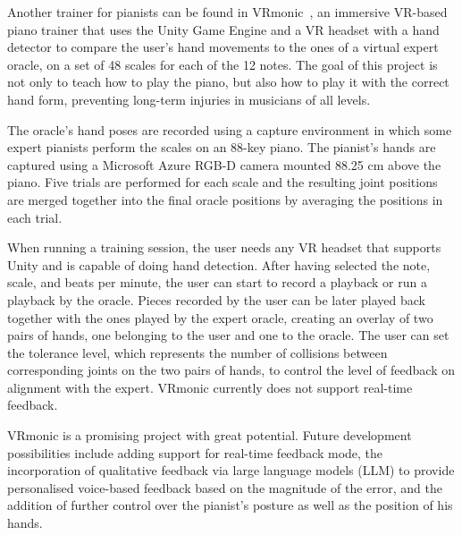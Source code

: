 Another trainer for pianists can be found in VRmonic~\cite{vrmonic-piano-trainer}, an immersive VR-based piano trainer
that uses the Unity Game Engine and a VR headset with a hand detector to compare the user's hand movements to the ones
of a virtual expert oracle, on a set of 48 scales for each of the 12 notes.
The goal of this project is not only to teach how to play the piano, but also how to play it with the
correct hand form, preventing long-term injuries in musicians of all levels.

The oracle's hand poses are recorded using a capture environment
in which some expert pianists perform the scales on an 88-key piano.
The pianist's hands are captured using a Microsoft Azure RGB-D camera mounted 88.25 cm above the piano.
Five trials are performed for each scale and the resulting joint positions are merged together into the final oracle positions by averaging the positions in each trial.

When running a training session, the user needs any VR headset that supports Unity and is capable of doing hand detection.
After having selected the note, scale, and beats per minute, the user can start to record a playback or run a playback by the oracle.
Pieces recorded by the user can be later played back together with the ones played by the expert oracle, creating an overlay of two pairs of hands, one belonging to the user and one to the oracle.
The user can set the tolerance level, which represents the number of collisions between corresponding joints on the two pairs of hands, to control the level of feedback on alignment with the expert.
VRmonic currently does not support real-time feedback.

VRmonic is a promising project with great potential.
Future development possibilities include adding support for real-time feedback mode,
the incorporation of qualitative feedback via large language models (LLM) to provide personalised voice-based
feedback based on the magnitude of the error, and the addition of further control over the pianist's posture
as well as the position of his hands.


